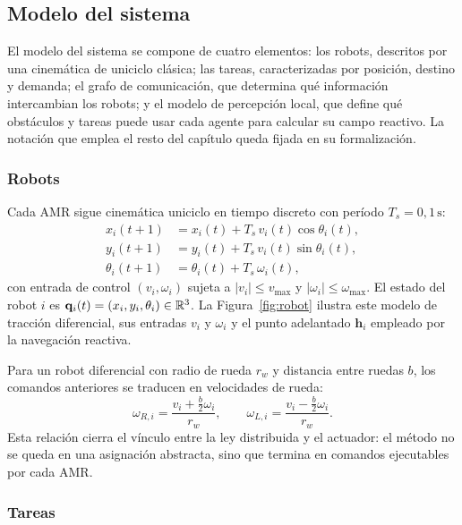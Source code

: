 \subsection{Modelo del sistema}

El modelo del sistema se compone de cuatro elementos: los robots, descritos por una
cinemática de uniciclo clásica; las tareas, caracterizadas por posición, destino y demanda; el
grafo de comunicación, que determina qué información intercambian los robots; y el
modelo de percepción local, que define qué obstáculos y tareas puede usar cada agente
para calcular su campo reactivo. La notación que emplea el resto del capítulo queda
fijada en su formalización.

\subsubsection{Robots}

Cada AMR sigue cinemática uniciclo en tiempo discreto con período $T_s = 0{,}1\,\text{s}$:
\begin{align}
  x_i(t+1) &= x_i(t) + T_s \, v_i(t)\cos\theta_i(t), \label{eq:unicycle_x}\\
  y_i(t+1) &= y_i(t) + T_s \, v_i(t)\sin\theta_i(t), \label{eq:unicycle_y}\\
  \theta_i(t+1) &= \theta_i(t) + T_s \, \omega_i(t), \label{eq:unicycle_theta}
\end{align}
con entrada de control $(v_i, \omega_i)$ sujeta a $|v_i| \leq v_{\max}$ y
$|\omega_i| \leq \omega_{\max}$. El estado del robot $i$ es
$\mathbf{q}_i(t) = (x_i, y_i, \theta_i) \in \mathbb{R}^3$. La Figura~\ref{fig:robot}
ilustra este modelo de tracción diferencial, sus entradas $v_i$ y $\omega_i$ y el
punto adelantado $\mathbf{h}_i$ empleado por la navegación reactiva.

Para un robot diferencial con radio de rueda $r_w$ y distancia entre ruedas $b$, los
comandos anteriores se traducen en velocidades de rueda:
\begin{equation}
  \omega_{R,i} = \frac{v_i + \frac{b}{2}\omega_i}{r_w}, \qquad
  \omega_{L,i} = \frac{v_i - \frac{b}{2}\omega_i}{r_w}.
  \label{eq:wheel_speeds}
\end{equation}
Esta relación cierra el vínculo entre la ley distribuida y el actuador: el método no se
queda en una asignación abstracta, sino que termina en comandos ejecutables por cada AMR.



\subsubsection{Tareas}

